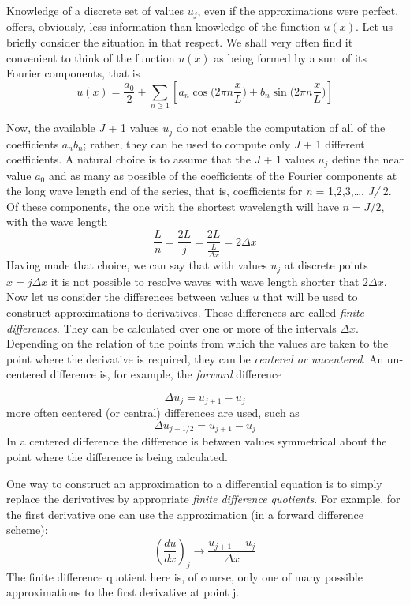 Knowledge of a discrete set of values $u_j$, even if the approximations were perfect, offers, obviously, less information than knowledge of the function $u(x)$. Let us briefly consider the situation in that respect. We shall very often find it convenient to think of the function $u(x)$ as being formed by a sum of its Fourier compo­nents, that is
$$u(x)=\frac{a_0}{2}+\displaystyle\sum_{n\geq 1}[a_n\cos\big(2\pi n\frac{x}{L}\big)+b_n\sin\big(2\pi n\frac{x}{L}\big)]$$

Now, the available \textit{J} + 1 values $u_j$ do not enable the computation of all of the coefficients $a_nb_n$; rather, they can be used to compute only \textit{J} + 1 different coefficients. A natural choice is to assume that the \textit{J} + 1 values $u_j$ define the near value $a_0$ and as many as possible of the coefficients of the Fourier components at the long wave length end of the series, that is, coefficients for \textit{n} = 1,2,3,…, \textit{J/} 2. Of these components, the one with the shortest wavelength will have $n=J/2$, with the wave length
$$\frac{L}{n}=\frac{2L}{j}=\frac{2L}{\frac{L}{\Delta x}}=2\Delta x$$
Having made that choice, we can say that with values $u_j$ at discrete points $x=j\Delta x$ it is not possible to resolve waves with wave length shorter that $2\Delta x$.
Now let us consider the differences between values $u$ that will be used to construct approximations to derivatives. These differences are called \textit{finite differences}. They can be calculated over one or more of the intervals $\Delta x$. Depending on the relation of the points from which the values are taken to the point where the derivative is required, they can be \textit{centered or uncentered}. An un-centered difference is, for example, the \textit{forward} difference

\begin{equation}\label{eq: forward difference}
	\Delta u_j=u_{j+1}-u_j
\end{equation}
more often centered (or central) differences are used, such as
\begin{equation}
	\Delta u_{j+1/2}=u_{j+1}-u_j
\end{equation}
In a centered difference the difference is between values symmetrical about the point where the difference is being calculated.

One way to construct an approximation to a differential equation is to simply replace the derivatives by appropriate \textit{finite difference quotients}. For example, for the first derivative one can use the approximation (in a forward difference scheme):
\begin{equation}\label{eq.finite diff der approx}
	\left(\frac{d u}{dx}\right)_j\rightarrow\frac{u_{j+1}-u_j}{\Delta x}
\end{equation}
The finite difference quotient here is, of course, only one of many possible approximations to the first derivative at point j.

